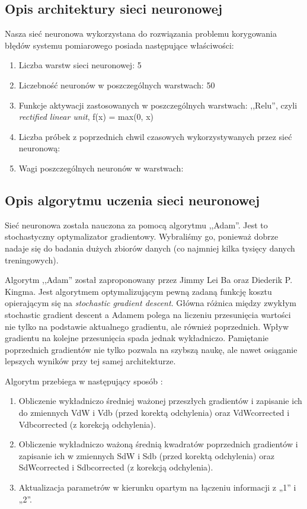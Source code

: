 \documentclass{classrep}
\begin{document}
\subsection{Opis architektury sieci neuronowej}
Nasza sieć neuronowa wykorzystana do rozwiązania problemu korygowania błędów systemu pomiarowego posiada następujące właściwości:
\begin{enumerate}
	\item Liczba warstw sieci neuronowej: 5
	\item Liczebność neuronów w poszczególnych warstwach: 50
	\item Funkcje aktywacji zastosowanych w poszczególnych warstwach: ,,Relu'', czyli  \textsl{rectified linear unit}, f(x) = max(0, x)
	\color{red} \item Liczba próbek z poprzednich chwil czasowych wykorzystywanych przez sieć neuronową: 
	\item Wagi poszczególnych neuronów w warstwach: 
\end{enumerate}
\subsection{Opis algorytmu uczenia sieci neuronowej}
Sieć neuronowa została nauczona za pomocą algorytmu ,,Adam''. Jest to stochastyczny optymalizator gradientowy. Wybraliśmy go, ponieważ dobrze nadaje się do badania dużych zbiorów danych (co najmniej kilka tysięcy danych treningowych). \cite{doc} 

Algorytm ,,Adam'' został zaproponowany przez Jimmy Lei Ba oraz Diederik P. Kingma. Jest algorytmem optymalizującym pewną zadaną funkcję kosztu opierającym się na \textsl{stochastic gradient descent}. Główna różnica między zwykłym stochastic gradient descent a Adamem polega na liczeniu przesunięcia wartości nie tylko na podstawie aktualnego gradientu, ale również poprzednich.
Wpływ gradientu na kolejne przesunięcia spada jednak wykładniczo. Pamiętanie poprzednich gradientów nie tylko pozwala na szybszą naukę, ale nawet osiąganie lepszych wyników przy tej samej architekturze. \cite{adampl} 

Algorytm przebiega w następujący sposób \cite{adamdzialanie}:
\begin{enumerate}
	\item Obliczenie wykładniczo średniej ważonej przeszłych gradientów i zapisanie ich do zmiennych VdW i Vdb (przed korektą odchylenia) oraz VdWcorrected i Vdbcorrected (z korekcją odchylenia).
	\item Obliczenie wykładniczo ważoną średnią kwadratów poprzednich gradientów i zapisanie ich w zmiennych SdW i Sdb (przed korektą odchylenia) oraz SdWcorrected i Sdbcorrected (z korekcją odchylenia).
	\item Aktualizacja parametrów w kierunku opartym na łączeniu informacji z „1” i „2”.
\end{enumerate}
\end{document}
